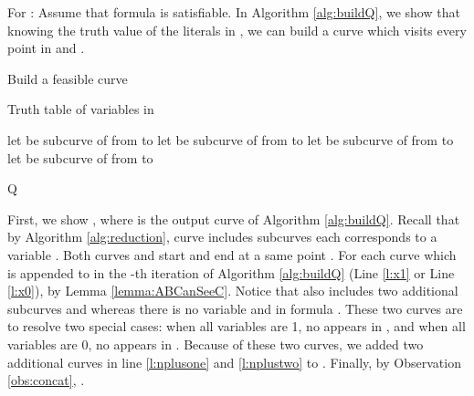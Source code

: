 \documentclass[12pt]{dalthesis}
\def\favoritefont{\bfseries \sffamily}
\def\QED{\ensuremath{{\Box}}}
\def\markatright#1{\leavevmode\unskip\nobreak\quad\hspace*{\fill}{#1}}
\newenvironment{proof}
	{\begin{trivlist}\item[\hskip\labelsep{\favoritefont Proof:}]}
	{\markatright{\QED}\end{trivlist}}
\begin{document}
\begin{proof}



For : 
Assume that  formula  is satisfiable. 
In Algorithm \ref{alg:buildQ}, we show that 
knowing the truth value of the literals in , 
we can build a curve  which 
visits every point in  and .



\begin{algorithm} [h]
\caption {{\sc Build a feasible curve  }} 
\label{alg:buildQ}
\begin{algorithmic}[1]	
		\baselineskip
	\REQUIRE  Truth table of variables  in 

	\STATE 
	\STATE  \label{l:startPoint}
	 
	\IF {}
	\STATE 
	\STATE let  be  subcurve of  from 	 to 
	\STATE let  be  subcurve of  from 	 to 
	\STATE   \label{l:visitCone}
	\ENDFOR
	\STATE  \label{l:x1}
	\ELSE 	
	\STATE 
	\STATE let  be  subcurve of  from 	 to 
	\STATE let  be  subcurve of  from 	 to 
	\STATE  \label{l:visitCzero}
	\ENDFOR
	\STATE  \label{l:x0}

	\ENDIF
	\STATE 
\ENDFOR
	\STATE \label{l:nplusone}
	\STATE 

	\STATE \label{l:nplustwo}
	\STATE   \label{l:endPoint}

	 {\sc Q}  
\end{algorithmic}
\end{algorithm}







First, we show , where 
is the output curve of Algorithm \ref{alg:buildQ}.
Recall that by Algorithm \ref{alg:reduction}, 
curve  includes  subcurves  each corresponds 
to a variable . 
Both curves  and  start and end at a same point .
For each curve  which is appended to  
in the -th iteration of Algorithm \ref{alg:buildQ} 
(Line \ref{l:x1} or Line \ref{l:x0}), 
  by Lemma \ref{lemma:ABCanSeeC}. 
Notice that  also includes two additional subcurves  and  
whereas there is no variable  and  in formula . 
These two curves are to resolve two special cases: 
when all variables  are 1,  no  appears in ,
and when all variables  are 0,  
no  appears in .
Because of these two curves, 
we added two additional curves in line \ref{l:nplusone}
and \ref{l:nplustwo} to . Finally, by  Observation 
\ref{obs:concat}, .



\end{proof}
\end{document}
